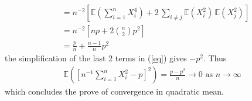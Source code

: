 \documentclass[a4paper,10pt]{article}
\theoremstyle{definition}
\begin{document}
\begin{enumerate}
\begin{align*}
&= n^{-2}\left[\mathbb{E}\left(\sum_{i=1}^{n}X_i^4\right)+2\,\sum_{i\neq j}\mathbb{E}\left(X_i^2\right)\,\mathbb{E}\left(X_j^2\right)\right]\\
&= n^{-2}\left[np +2\binom{n}{2}p^2\right]\\
&=\frac{p}{n} + \frac{n-1}{n}p^2
\end{align*}
the simplification of the last 2 terms in (\ref{eq}) gives $-p^2$. Thus
\begin{align*}
\mathbb{E}\left(\left[n^{-1}\sum_{i=1}^{n}X_i^2-p \right]^2\right) = \frac{p-p^2}{n} \to 0 \text{ as } n \to \infty
\end{align*}
which concludes the prove of convergence in quadratic mean.
\end{enumerate}
\end{document}
